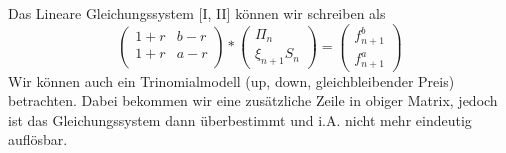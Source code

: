 \begin{*bemerkung}
	Das Lineare Gleichungssystem [I, II] können wir schreiben als
	\begin{equation*}
		\begin{pmatrix}
			1+r & b - r \\
			1+r & a - r \\
		\end{pmatrix}
		* 
		\begin{pmatrix}
			\Pi_n \\ \xi_{n+1} S_n
		\end{pmatrix}
		= 
		\begin{pmatrix}
			f_{n+1}^b \\ f_{n+1}^a
		\end{pmatrix}
		\tag{LGS-1} \label{eq: 2_2_lgs-1}
	\end{equation*}
	Wir können auch ein Trinomialmodell (up, down, gleichbleibender Preis) betrachten. Dabei bekommen wir eine zusätzliche Zeile in obiger Matrix, jedoch ist das Gleichungssystem dann überbestimmt und i.A. nicht mehr eindeutig auflösbar.
\end{*bemerkung}

